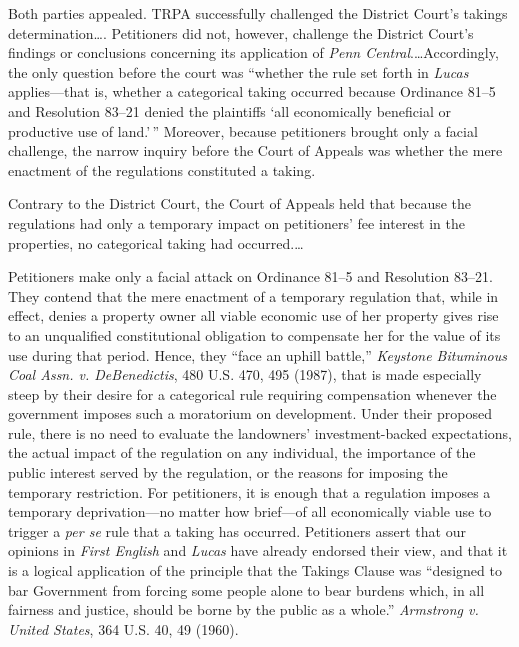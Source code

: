 Both parties appealed. TRPA successfully challenged the District Court's takings
determination\ldots . Petitioners did not, however, challenge the District
Court's findings or conclusions concerning its application of \textit{Penn
Central}.\ldots Accordingly, the only question before the court was ``whether
the rule set forth in \textit{Lucas} applies---that is, whether a categorical
taking occurred because Ordinance 81--5 and Resolution 83--21 denied the
plaintiffs `all economically beneficial or productive use of land.'\,''
Moreover,
because petitioners brought only a facial challenge, the narrow inquiry before
the Court of Appeals was whether the mere enactment of the regulations
constituted a taking.

Contrary to the District Court, the Court of Appeals held that because the
regulations had only a temporary impact on petitioners' fee interest in the
properties, no categorical taking had occurred.\ldots



Petitioners make only a facial attack on Ordinance 81--5 and Resolution 83--21.
They contend that the mere enactment of a temporary regulation that, while in
effect, denies a property owner all viable economic use of her property gives
rise to an unqualified constitutional obligation to compensate her for the value
of its use during that period. Hence, they ``face an uphill battle,''
\textit{Keystone Bituminous Coal Assn. v. DeBenedictis}, 480 U.S. 470, 495
(1987), that is made especially steep by their desire for a categorical rule
requiring compensation whenever the government imposes such a moratorium on
development. Under their proposed rule, there is no need to evaluate the
landowners' investment-backed expectations, the actual impact of the regulation
on any individual, the importance of the public interest served by the
regulation, or the reasons for imposing the temporary restriction. For
petitioners, it is enough that a regulation imposes a temporary deprivation---no
matter how brief---of all economically viable use to trigger a \textit{per se}
rule that a taking has occurred. Petitioners assert that our opinions in
\textit{First English} and \textit{Lucas} have already endorsed their view, and
that it is a logical application of the principle that the Takings Clause was
``designed to bar Government from forcing some people alone to bear burdens
which, in all fairness and justice, should be borne by the public as a whole.''
\textit{Armstrong v. United States}, 364 U.S. 40, 49 (1960).

